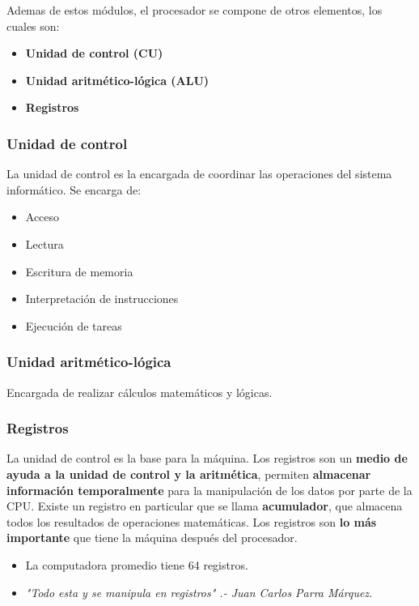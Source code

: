 \documentclass{templateNote}
\begin{document}
\noindent Ademas de estos módulos, el procesador se compone de otros elementos, los cuales son:
\begin{itemize}
    \item \textbf{Unidad de control (CU)}
    \item \textbf{Unidad aritmético-lógica (ALU)}
    \item \textbf{Registros}
\end{itemize}

\subsubsection{Unidad de control}
\noindent La unidad de control es la encargada de coordinar las operaciones del sistema informático. Se encarga de:
\begin{itemize}
    \item Acceso
    \item Lectura
    \item Escritura de memoria
    \item Interpretación de instrucciones
    \item Ejecución de tareas
\end{itemize}
\subsubsection{Unidad aritmético-lógica}
\noindent Encargada de realizar cálculos matemáticos y lógicas.
\subsubsection{Registros}
\noindent La unidad de control es la base para la máquina. Los registros son un \textbf{medio de ayuda a la unidad de control y la aritmética}, 
permiten \textbf{almacenar información temporalmente} para la manipulación de los datos por parte de la CPU. Existe un registro en particular 
que se llama \textbf{acumulador}, que almacena todos los resultados de operaciones matemáticas. Los registros son \textbf{lo más importante} 
que tiene la máquina después del procesador.

\begin{tcolorbox}[colback=orange!10!white,colframe=orange!75!black,title=Observaciones]
    \begin{itemize}
        \item La computadora promedio tiene 64 registros.%
        \item \textit{"Todo esta y se manipula en registros" \space.- Juan Carlos Parra Márquez.}
    \end{itemize}
\end{tcolorbox}
\end{document}
